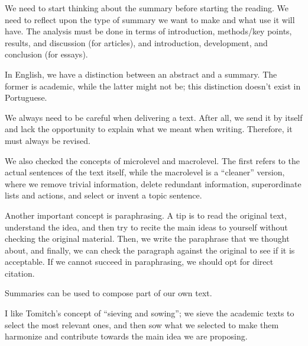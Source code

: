 We need to start thinking about the summary before starting the reading. We need to reflect upon the type of summary we want to make and what use it will have. The analysis must be done in terms of introduction, methods/key points, results, and discussion (for articles), and introduction, development, and conclusion (for essays).

In English, we have a distinction between an abstract and a summary. The former is academic, while the latter might not be; this distinction doesn't exist in Portuguese.

We always need to be careful when delivering a text. After all, we send it by itself and lack the opportunity to explain what we meant when writing. Therefore, it must always be revised.

We also checked the concepts of microlevel and macrolevel. The first refers to the actual sentences of the text itself, while the macrolevel is a ``cleaner'' version, where we remove trivial information, delete redundant information, superordinate lists and actions, and select or invent a topic sentence.

Another important concept is paraphrasing. A tip is to read the original text, understand the idea, and then try to recite the main ideas to yourself without checking the original material. Then, we write the paraphrase that we thought about, and finally, we can check the paragraph against the original to see if it is acceptable. If we cannot succeed in paraphrasing, we should opt for direct citation.

Summaries can be used to compose part of our own text.

I like Tomitch's concept of ``sieving and sowing''; we sieve the academic texts to select the most relevant ones, and then sow what we selected to make them harmonize and contribute towards the main idea we are proposing.

